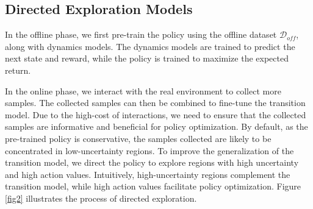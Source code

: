 \documentclass[letterpaper]{article} %
\begin{document}
\subsection{Directed Exploration Models}
In the offline phase, we first pre-train the policy using the offline dataset \( \mathcal{D}_{off} \), along with dynamics models. The dynamics models are trained to predict the next state and reward, while the policy is trained to maximize the expected return.

In the online phase, we interact with the real environment to collect more samples. The collected samples can then be combined to fine-tune the transition model. Due to the high-cost of interactions, we need to ensure that the collected samples are informative and beneficial for policy optimization. By default, as the pre-trained policy is conservative, the samples collected are likely to be concentrated in low-uncertainty regions. To improve the generalization of the transition model, we direct the policy to explore regions with high uncertainty and high action values. Intuitively, high-uncertainty regions complement the transition model, while high action values facilitate policy optimization. Figure \ref{fig2} illustrates the process of directed exploration.
\end{document}
